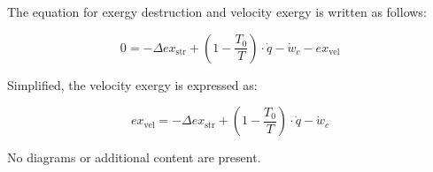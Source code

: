 The equation for exergy destruction and velocity exergy is written as follows:

\[
0 = -\Delta ex_{\text{str}} + \left(1 - \frac{T_0}{T}\right) \cdot \dot{q} - \dot{w}_c - ex_{\text{vel}}
\]

Simplified, the velocity exergy is expressed as:

\[
ex_{\text{vel}} = -\Delta ex_{\text{str}} + \left(1 - \frac{T_0}{T}\right) \cdot \dot{q} - \dot{w}_c
\]  

No diagrams or additional content are present.